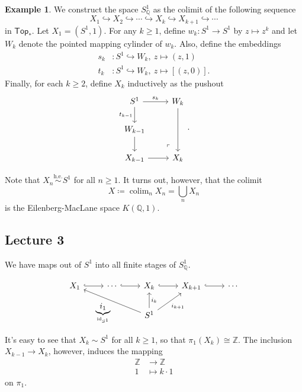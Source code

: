 \documentclass[10pt,letterpaper,cm]{nupset}
\theoremstyle{definition}
\newtheorem{exmp}[defn]{Example}
\theoremstyle{theorem}
\theoremstyle{remark}
\newcommand{\Q}{\mathbb Q}
\newcommand{\Z}{\mathbb Z}
\newcommand{\1}{\mathbb{1}}
\newcommand{\0}{\vec 0}
\DeclareMathOperator{\id}{id}
\DeclareMathOperator{\colim}{colim}
\begin{document}
\begin{exmp}\label{circrat}
We construct the space $S^1_{\Q}$ as the colimit of the following sequence 
\[
X_1 \hookrightarrow X_2 \hookrightarrow \cdots \hookrightarrow X_k \hookrightarrow X_{k+1} \hookrightarrow \cdots 
\] in $\mathsf{Top}_{\ast}$. Let $X_1 = \left(S^1, 1\right)$. For any $k\geq 1$, define $w_k : S^1 \to S^1$ by $z \mapsto z^k$ and let $W_k$ denote the pointed mapping cylinder of $w_k$.  Also, define the embeddings
\begin{align*}
s_k & : S^1 \hookrightarrow W_k, \ z \mapsto \left(z,1\right)
\\ t_k & : S^1 \hookrightarrow W_k, \ z \mapsto \left[\left(z,0\right)\right].
\end{align*}
Finally, for each $k\geq 2$, define $X_k$ inductively as the pushout
\[\begin{tikzcd}
	{S^1} & {W_k} \\
	{W_{k-1}} \\
	{X_{k-1}} & {X_k}
	\arrow[from=3-1, to=3-2]
	\arrow["{t_{k-1}}"', from=1-1, to=2-1]
	\arrow[from=2-1, to=3-1]
	\arrow["{s_k}", from=1-1, to=1-2]
	\arrow[from=1-2, to=3-2]
	\arrow["\lrcorner"{anchor=center, pos=0.125, rotate=180}, draw=none, from=3-2, to=1-1]
\end{tikzcd} .\]

Note that $X_n \overset{\text{h.e.}}{\sim} S^1$ for all $n\geq 1$. It turns out, however, that the colimit 
\[
X \coloneqq \colim_n{X_n} = \bigcup_nX_n
\] is the Eilenberg-MacLane space $K(\Q,1)$.
\end{exmp}




\subsection{Lecture 3}

We have maps out of $S^1$ into all finite stages of $S^1_{\Q}$.

\[\begin{tikzcd}
	{X_1} & \cdots & {X_k} & {X_{k+1}} & \cdots \\
	&& {S^1}
	\arrow[hook, from=1-1, to=1-2]
	\arrow[hook, from=1-2, to=1-3]
	\arrow[hook, from=1-3, to=1-4]
	\arrow[hook, from=1-4, to=1-5]
	\arrow["{\underbrace{i_1}_{\id_{S^1}}}", from=2-3, to=1-1]
	\arrow["{i_k}"', from=2-3, to=1-3]
	\arrow["{i_{k+1}}"', from=2-3, to=1-4]
\end{tikzcd}\]

It's easy to see that $X_k \sim S^1$ for all $k\geq 1$, so that $\pi_1(X_k) \cong \Z$.  The inclusion $X_{k-1} \to X_k$, however, induces the mapping 
\begin{align*}
\Z & \to \Z
\\ 1 & \mapsto k \cdot 1
\end{align*} on $\pi_1$.
\end{document}
